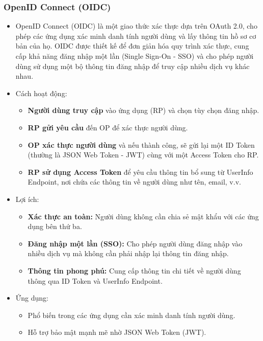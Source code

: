 \subsubsection{OpenID Connect (OIDC)}
\begin{itemize}
    \item OpenID Connect (OIDC) là một giao thức xác thực dựa trên OAuth 2.0, cho phép các ứng dụng xác minh danh tính người dùng và lấy thông tin hồ sơ cơ bản của họ. OIDC được thiết kế để đơn giản hóa quy trình xác thực, cung cấp khả năng đăng nhập một lần (Single Sign-On - SSO) và cho phép người dùng sử dụng một bộ thông tin đăng nhập để truy cập nhiều dịch vụ khác nhau.
    \item Cách hoạt động:
    \begin{itemize}
        \item \textbf{Người dùng truy cập} vào ứng dụng (RP) và chọn tùy chọn đăng nhập.
        \item \textbf{RP gửi yêu cầu} đến OP để xác thực người dùng.

        \item \textbf{OP xác thực người dùng} và nếu thành công, sẽ gửi lại một ID Token (thường là JSON Web Token - JWT) cùng với một Access Token cho RP.
        \item \textbf{RP sử dụng Access Token} để yêu cầu thông tin bổ sung từ UserInfo Endpoint, nơi chứa các thông tin về người dùng như tên, email, v.v.

    \end{itemize}
    \item Lợi ích:
    \begin{itemize}
        \item \textbf{Xác thực an toàn:} Người dùng không cần chia sẻ mật khẩu với các ứng dụng bên thứ ba.
        \item \textbf{Đăng nhập một lần (SSO):} Cho phép người dùng đăng nhập vào nhiều dịch vụ mà không cần phải nhập lại thông tin đăng nhập.

        \item \textbf{Thông tin phong phú:} Cung cấp thông tin chi tiết về người dùng thông qua ID Token và UserInfo Endpoint.
    \end{itemize}
    \item Ứng dụng:
    \begin{itemize}
        \item Phổ biến trong các ứng dụng cần xác minh danh tính người dùng.

        \item Hỗ trợ bảo mật mạnh mẽ nhờ JSON Web Token (JWT).

    \end{itemize}
\end{itemize}

